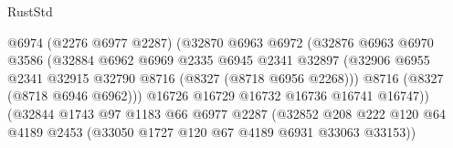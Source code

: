 \begin{lexlean}{RustStd}
\begin{coremodule}
                                            @6974
                                            (@2276 @6977 @2287)
                                            (@32870
                                              @6963
                                              @6972
                                              (@32876
                                                @6963
                                                @6970
                                                @3586
                                                (@32884
                                                  @6962
                                                  @6969
                                                  @2335
                                                  @6945
                                                  @2341
                                                  @32897
                                                  (@32906
                                                    @6955
                                                    @2341
                                                    @32915
                                                    @32790
                                                    @8716
                                                    (@8327 (@8718 @6956 @2268)))
                                                  @8716
                                                  (@8327 (@8718 @6946 @6962)))
                                                @16726
                                                @16729
                                                @16732
                                                @16736
                                                @16741
                                                @16747))
                                            (@32844
                                              @1743
                                              @97
                                              @1183
                                              @66
                                              @6977
                                              @2287
                                              (@32852
                                                @208
                                                @222
                                                @120
                                                @64
                                                @4189
                                                @2453
                                                (@33050 @1727 @120 @67 @4189 @6931 @33063 @33153))

\end{coremodule}
\end{lexlean}
